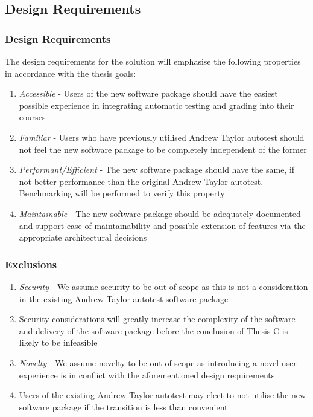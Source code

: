 \documentclass[xcolor]{beamer}
\begin{document}
\subsection{Design Requirements}
\begin{frame}
	\frametitle{Design Requirements}
	The design requirements for the solution will emphasise the following properties in accordance with the thesis goals:\\
	\begin{enumerate}
		\setlength\itemsep{0.5em}
		\item \textit{Accessible} - Users of the new software package should have the easiest possible experience in integrating automatic testing and grading into their courses
			\pause
		\item \textit{Familiar} - Users who have previously utilised Andrew Taylor autotest should not feel the new software package to be completely independent of the former 
			\pause
		\item \textit{Performant/Efficient} - The new software package should have the same, if not better performance than the original Andrew Taylor autotest. Benchmarking will be performed to verify this property
			\pause
		\item \textit{Maintainable} - The new software package should be adequately documented and support ease of maintainability and possible extension of features via the appropriate architectural decisions
	\end{enumerate}
\end{frame}
\begin{frame}
	\frametitle{Exclusions}
	\begin{enumerate}
		\setlength\itemsep{1em}
		\item \textit{Security} - We assume security to be out of scope as this is not a consideration in the existing Andrew Taylor autotest software package
			\pause
		\item Security considerations will greatly increase the complexity of the software and delivery of the software package before the conclusion of Thesis C is likely to be infeasible
			\pause
		\item \textit{Novelty} - We assume novelty to be out of scope as introducing a novel user experience is in conflict with the aforementioned design requirements
			\pause
		\item Users of the existing Andrew Taylor autotest may elect to not utilise the new software package if the transition is less than convenient
	\end{enumerate}
\end{frame}
\end{document}
